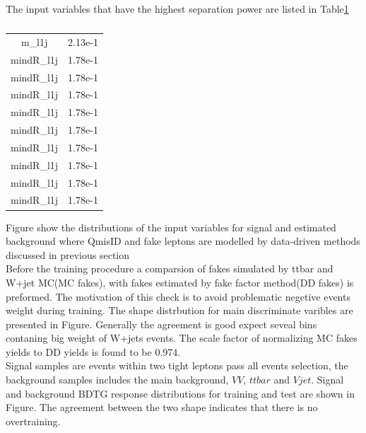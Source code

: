 The input variables that have the highest separation power are listed in Table\ref{tab:separation_power} \\
\begin{table}[h!]
 \begin{center}
   \begin{tabular}{cc}
     \toprule
              &  \\
     \midrule
      m_l1j              & 2.13e-1\\
     \midrule       
      mindR_l1j          & 1.78e-1\\
     \midrule       
      mindR_l1j          & 1.78e-1\\
     \midrule       
      mindR_l1j          & 1.78e-1\\
     \midrule       
      mindR_l1j          & 1.78e-1\\
     \midrule       
      mindR_l1j          & 1.78e-1\\
     \midrule       
      mindR_l1j          & 1.78e-1\\
     \midrule       
      mindR_l1j          & 1.78e-1\\
     \midrule       
      mindR_l1j          & 1.78e-1\\
     \midrule       
      mindR_l1j          & 1.78e-1\\
     \bottomrule
   \end{tabular}
   \caption{\label{tab:separation_power}}
 \end{center}
\end{table}
Figure show the distributions of the input variables for signal and estimated background where QmisID and fake leptons are modelled by data-driven methods discussed in previous section\\

Before the training procedure a comparsion of fakes simulated by ttbar and W+jet MC(MC fakes), with fakes estimated by fake factor method(DD fakes) is preformed. The motivation of this check is to avoid problematic negetive events weight during training. The shape distrbution for main discriminate varibles are presented in Figure. Generally the agreement is good expect seveal bins contaning big weight of W+jets events. The scale factor of normalizing MC fakes yields to DD yields is found to be 0.974.\\
Signal samples are events within two tight leptons pass all events selection, the background samples includes the main background, $VV$, $ttbar$ and $Vjet$. Signal and background BDTG response distributions for training and test are shown in Figure. The agreement between the two shape indicates that there is no overtraining.\\

